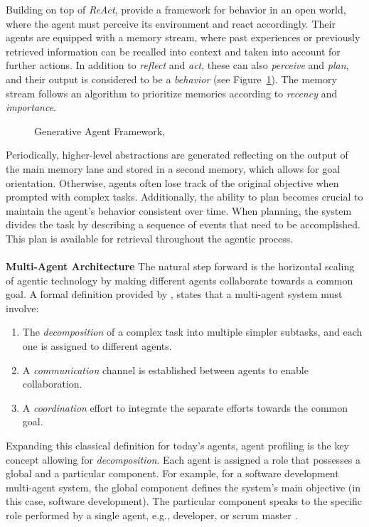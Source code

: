Building on top of \textit{ReAct}, \textcite[pp. 8-11]{Park.07.04.2023} provide a framework for behavior in an open world, where the agent must perceive its environment and react accordingly. Their agents are equipped with a memory stream, where past experiences or previously retrieved information can be recalled into context and taken into account for further actions. In addition to \textit{reflect} and \textit{act}, these can also \textit{perceive} and \textit{plan}, and their output is considered to be a \textit{behavior} (see Figure~\ref{fig:agent}). The memory stream follows an algorithm to prioritize memories according to \textit{recency} and \textit{importance}. \\ \noindent
\begin{figure}
    \centering
    \caption{Generative Agent Framework, \textcite{Park.07.04.2023}}
    \label{fig:agent}
\end{figure}
Periodically, higher-level abstractions are generated reflecting on the output of the main memory lane and stored in a second memory, which allows for goal orientation. Otherwise, agents often lose track of the original objective when prompted with complex tasks. Additionally, the ability to plan becomes crucial to maintain the agent's behavior consistent over time. When planning, the system divides the task by describing a sequence of events that need to be accomplished. This plan is available for retrieval throughout the agentic process. \\\\
\textbf{Multi-Agent Architecture} \indent The natural step forward is the horizontal scaling of agentic technology by making different agents collaborate towards a common goal. A formal definition provided by \textcite[pp. 8-9]{wolpert_introduction_1999}, states that a multi-agent system must involve:
\begin{enumerate}
    \item The \textit{decomposition} of a complex task into multiple simpler subtasks, and each one is assigned to different agents.
    \item A \textit{communication} channel is established between agents to enable collaboration.
    \item A \textit{coordination} effort to integrate the separate efforts towards the common goal.
\end{enumerate}
Expanding this classical definition for today's agents, agent profiling is the key concept allowing for \textit{decomposition}. Each agent is assigned a role that possesses a global and a particular component. For example, for a software development multi-agent system, the global component defines the system's main objective (in this case, software development). The particular component speaks to the specific role performed by a single agent, e.g., developer, or scrum master \parencite[cf.][p. 3]{guo_large_2024}.\\\\
